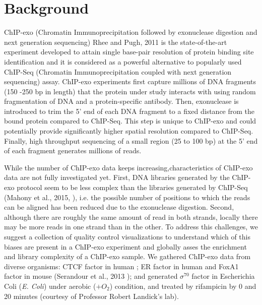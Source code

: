 \documentclass{bmcart}\usepackage[]{graphicx}\usepackage[]{color}
\newcommand{\sig}{\sigma^{70}}
\begin{document}
\listoftables

\newpage

\section{Background}
\label{sec:intro}

ChIP-exo (Chromatin Immunoprecipitation followed by exonuclease
digestion and next generation sequencing) Rhee and Pugh, 2011
\cite{exo1} is the state-of-the-art experiment developed to attain
single base-pair resolution of protein binding site identification and
it is considered as a powerful alternative to popularly used ChIP-Seq
(Chromatin Immunoprecipitation coupled with next generation
sequencing) assay. ChIP-exo experiments first capture millions of DNA
fragments (150 -250 bp in length) that the protein under study
interacts with using random fragmentation of DNA and a
protein-specific antibody. Then, exonuclease is introduced to trim the
5' end of each DNA fragment to a fixed distance from the bound protein
compared to ChIP-Seq. This step is unique to ChIP-exo and could
potentially provide significantly higher spatial resolution compared
to ChIP-Seq. Finally, high throughput sequencing of a small region (25
to 100 bp) at the 5' end of each fragment generates millions of reads.

While the number of ChIP-exo data keeps increasing,characteristics of
ChIP-exo data are not fully investigated yet. First, DNA libraries
generated by the ChIP-exo protocol seem to be less complex than the
libraries generated by ChIP-Seq (Mahony et al., 2015,
\cite{exo_review}), i.e. the possible number of positions to which the
reads can be aligned has been reduced due to the exonuclease
digestion. Second, although there are roughly the same amount of read
in both strands, locally there may be more reads in one strand than in
the other. To address this challenges, we suggest a collection of
quality control visualizations to understand which of this biases are
present in a ChIP-exo experiment and globally asses the enrichment and
library complexity of a ChIP-exo sample. We gathered ChIP-exo data from
diverse organisms: CTCF factor in human \cite{exo1}; ER factor in
human and FoxA1 factor in mouse (Serandour et al., 2013
\cite{exoillumina}); and generated $\sig$ factor in Escherichia Coli
(\emph{E. Coli}) under aerobic ($ + O_2$) condition, and treated by
rifampicin by 0 and 20 minutes (courtesy of Professor Robert Landick's
lab). %
\end{document}
